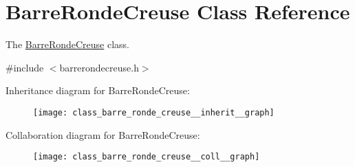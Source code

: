 \hypertarget{class_barre_ronde_creuse}{}\section{Barre\+Ronde\+Creuse Class Reference}
\label{class_barre_ronde_creuse}


The \hyperlink{class_barre_ronde_creuse}{Barre\+Ronde\+Creuse} class.  




{\ttfamily \#include $<$barrerondecreuse.\+h$>$}



Inheritance diagram for Barre\+Ronde\+Creuse\+:
\nopagebreak
\begin{figure}[H]
\begin{center}
\leavevmode
\texttt{[image: class\_barre\_ronde\_creuse\_\_inherit\_\_graph]}
\end{center}
\end{figure}


Collaboration diagram for Barre\+Ronde\+Creuse\+:
\nopagebreak
\begin{figure}[H]
\begin{center}
\leavevmode
\texttt{[image: class\_barre\_ronde\_creuse\_\_coll\_\_graph]}
\end{center}
\end{figure}
